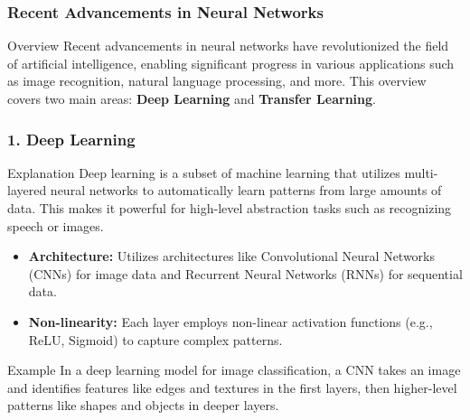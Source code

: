 \documentclass[aspectratio=169]{beamer}
\begin{document}
\begin{frame}[fragile]
    \frametitle{Recent Advancements in Neural Networks}
    \begin{block}{Overview}
        Recent advancements in neural networks have revolutionized the field of artificial intelligence, enabling significant progress in various applications such as image recognition, natural language processing, and more. This overview covers two main areas: \textbf{Deep Learning} and \textbf{Transfer Learning}.
    \end{block}
\end{frame}

\begin{frame}[fragile]
    \frametitle{1. Deep Learning}
    \begin{block}{Explanation}
        Deep learning is a subset of machine learning that utilizes multi-layered neural networks to automatically learn patterns from large amounts of data. This makes it powerful for high-level abstraction tasks such as recognizing speech or images.
    \end{block}
    
    \begin{itemize}
        \item \textbf{Architecture:} Utilizes architectures like Convolutional Neural Networks (CNNs) for image data and Recurrent Neural Networks (RNNs) for sequential data.
        \item \textbf{Non-linearity:} Each layer employs non-linear activation functions (e.g., ReLU, Sigmoid) to capture complex patterns.
    \end{itemize}
    
    \begin{block}{Example}
        In a deep learning model for image classification, a CNN takes an image and identifies features like edges and textures in the first layers, then higher-level patterns like shapes and objects in deeper layers.
    \end{block}
\end{frame}
\end{document}
